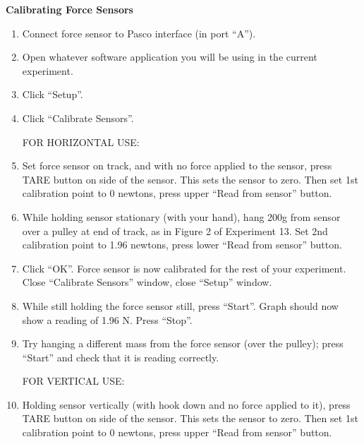 \textbf{Calibrating Force Sensors}

\begin{enumerate}
\item Connect force sensor to Pasco interface (in port ``A'').

\item Open whatever software application you will be using in the current experiment.

\item Click ``Setup''.

\item Click ``Calibrate Sensors''.

\vspace{0.1in}
\hspace{-0.2in}FOR HORIZONTAL USE:

\item Set force sensor on track, and with no force applied to the sensor, press TARE button on side of the sensor. This sets the sensor to zero. Then set 1st calibration point to 0 newtons, press upper ``Read from sensor'' button.

\item While holding sensor stationary (with your hand), hang 200g from sensor over a pulley at end of track, as in Figure 2 of Experiment 13. Set 2nd calibration point to 1.96 newtons, press lower ``Read from sensor'' button.

\item Click ``OK''. Force sensor is now calibrated for the rest of your experiment. Close ``Calibrate Sensors'' window, close ``Setup'' window.

\item While still holding the force sensor still, press ``Start''. Graph should now show a reading of 1.96 N. Press ``Stop''.

\item Try hanging a different mass from the force sensor (over the pulley); press ``Start'' and check that it is reading correctly.

\vspace{0.1in}
\hspace{-0.2in}FOR VERTICAL USE:

\setcounter{enumi}{4}

\item Holding sensor vertically (with hook down and no force applied to it), press TARE button on side of the sensor. This sets the sensor to zero. Then set 1st calibration point to 0 newtons, press upper ``Read from sensor'' button.


\end{enumerate}
